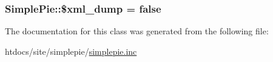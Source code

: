 \hypertarget{class_simple_pie_af8f83cf420d4339130d0a5af30edd90f}{
\subsubsection[{\$xml\-\_\-dump}]{\setlength{\rightskip}{0pt plus 5cm}Simple\-Pie\-::\$xml\-\_\-dump = false}}\label{class_simple_pie_af8f83cf420d4339130d0a5af30edd90f}


The documentation for this class was generated from the following file\-:\begin{DoxyCompactItemize}
\item 
htdocs/site/simplepie/\hyperlink{simplepie_8inc}{simplepie.\-inc}\end{DoxyCompactItemize}
